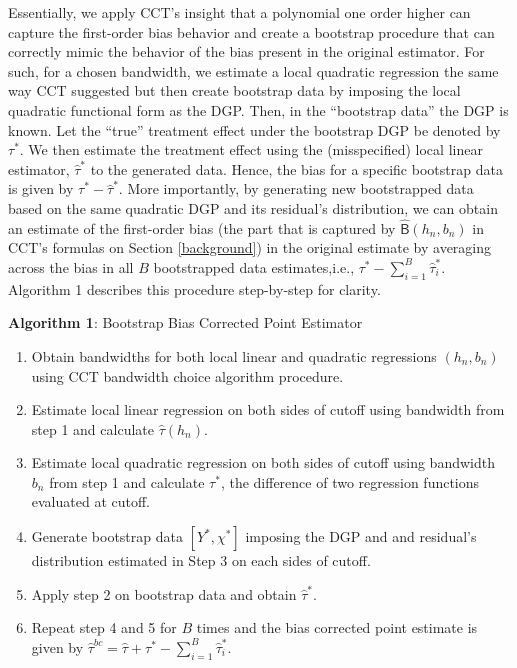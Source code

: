 \documentclass[12pt,fleqn]{article}
\begin{document}
Essentially, we apply CCT's insight that a polynomial one order higher can capture the first-order bias behavior and create a bootstrap procedure that can correctly mimic the behavior of the bias present in the original estimator. For such, for a chosen bandwidth, we estimate a local quadratic regression the same way CCT suggested but then create bootstrap data by imposing the local quadratic functional form as the DGP. Then, in the ``bootstrap data'' the DGP is known. Let the ``true'' treatment effect under the bootstrap DGP be denoted by $\tau^{*}$. We then estimate the treatment effect using the (misspecified) local linear estimator, $\hat{\tau}^{*}$ to the generated data. Hence, the bias for a specific bootstrap data is given by $\tau^{*}-\hat{\tau}^{*}$. More importantly, by generating new bootstrapped data based on the same quadratic DGP and its residual's distribution, we can obtain an estimate of the first-order bias (the part that is captured by $\hat{\mathsf{B}}(h_{n},b_{n})$ in CCT's formulas on Section \ref{background}) in the original estimate by averaging across the bias in all $B$ bootstrapped data estimates,i.e., $\tau^{*} - \sum_{i = 1}^{B} \hat{\tau}_{ i}^{*}$. Algorithm 1 describes this procedure step-by-step for clarity.

\textbf{Algorithm 1}: Bootstrap Bias Corrected Point Estimator
 \begin{enumerate}
	\item Obtain bandwidths for both local linear and quadratic regressions $(h_{n}, b_{n})$ using CCT bandwidth choice algorithm procedure.
	\item Estimate local linear regression on both sides of cutoff using bandwidth from step 1 and calculate $\hat{\tau}(h_{n})$.
	\item Estimate local quadratic regression on both sides of cutoff using bandwidth $b_{n}$ from step 1 and calculate $\tau^{*}$, the difference of two regression functions evaluated at cutoff.
	\item Generate bootstrap data $[Y^{*},\chi^{*}]$ imposing the DGP and and residual's distribution estimated in Step 3 on each sides of cutoff.
	\item Apply step 2 on bootstrap data and obtain $\hat{\tau}^{*}$.
	\item Repeat step 4 and 5 for $B$ times and the bias corrected point estimate is given by $\hat{\tau}^{bc}=\hat{\tau} + \tau^{*} - \sum_{i = 1}^{B} \hat{\tau}_{ i}^{*}$.
 \end{enumerate}
\end{document}
